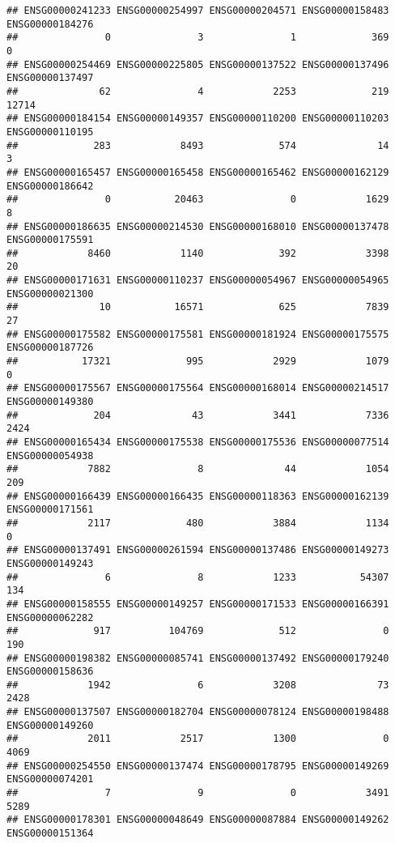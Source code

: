 \documentclass[
]{article}
\begin{document}
\begin{verbatim}
## ENSG00000241233 ENSG00000254997 ENSG00000204571 ENSG00000158483 ENSG00000184276 
##               0               3               1             369               0 
## ENSG00000254469 ENSG00000225805 ENSG00000137522 ENSG00000137496 ENSG00000137497 
##              62               4            2253             219           12714 
## ENSG00000184154 ENSG00000149357 ENSG00000110200 ENSG00000110203 ENSG00000110195 
##             283            8493             574              14               3 
## ENSG00000165457 ENSG00000165458 ENSG00000165462 ENSG00000162129 ENSG00000186642 
##               0           20463               0            1629               8 
## ENSG00000186635 ENSG00000214530 ENSG00000168010 ENSG00000137478 ENSG00000175591 
##            8460            1140             392            3398              20 
## ENSG00000171631 ENSG00000110237 ENSG00000054967 ENSG00000054965 ENSG00000021300 
##              10           16571             625            7839              27 
## ENSG00000175582 ENSG00000175581 ENSG00000181924 ENSG00000175575 ENSG00000187726 
##           17321             995            2929            1079               0 
## ENSG00000175567 ENSG00000175564 ENSG00000168014 ENSG00000214517 ENSG00000149380 
##             204              43            3441            7336            2424 
## ENSG00000165434 ENSG00000175538 ENSG00000175536 ENSG00000077514 ENSG00000054938 
##            7882               8              44            1054             209 
## ENSG00000166439 ENSG00000166435 ENSG00000118363 ENSG00000162139 ENSG00000171561 
##            2117             480            3884            1134               0 
## ENSG00000137491 ENSG00000261594 ENSG00000137486 ENSG00000149273 ENSG00000149243 
##               6               8            1233           54307             134 
## ENSG00000158555 ENSG00000149257 ENSG00000171533 ENSG00000166391 ENSG00000062282 
##             917          104769             512               0             190 
## ENSG00000198382 ENSG00000085741 ENSG00000137492 ENSG00000179240 ENSG00000158636 
##            1942               6            3208              73            2428 
## ENSG00000137507 ENSG00000182704 ENSG00000078124 ENSG00000198488 ENSG00000149260 
##            2011            2517            1300               0            4069 
## ENSG00000254550 ENSG00000137474 ENSG00000178795 ENSG00000149269 ENSG00000074201 
##               7               9               0            3491            5289 
## ENSG00000178301 ENSG00000048649 ENSG00000087884 ENSG00000149262 ENSG00000151364 

\end{verbatim}
\end{document}
